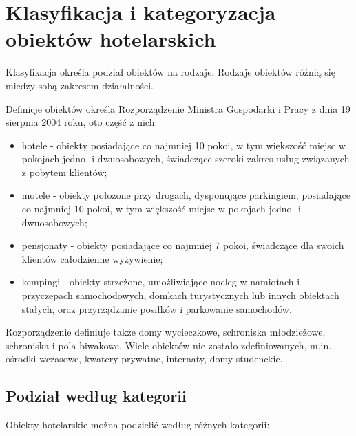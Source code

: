 \documentclass[a4paper,onecolumn,oneside,11pt,wide,floatssmall]{mwrep}
\theoremstyle{definition}
\theoremstyle{plain}%
\theoremstyle{remark}
\begin{document}
\section{Klasyfikacja i kategoryzacja obiektów hotelarskich}
Klasyfikacja określa podział obiektów na rodzaje. Rodzaje obiektów różnią 
się miedzy sobą zakresem działalności.

Definicje obiektów określa Rozporządzenie Ministra Gospodarki i Pracy z dnia 
19 sierpnia 2004 roku, oto część z nich:

\begin{itemize}
  \item hotele - obiekty posiadające co najmniej 10 pokoi, w tym większość 
  miejsc w pokojach jedno- i dwuosobowych, świadczące szeroki zakres usług 
  związanych z pobytem klientów;
  \item motele - obiekty położone przy drogach, dysponujące parkingiem, 
  posiadające co najmniej 10 pokoi, w tym większość miejsc w pokojach jedno- 
  i dwuosobowych;
  \item pensjonaty - obiekty posiadające co najmniej 7 pokoi, świadczące dla 
  swoich klientów całodzienne wyżywienie;
  \item kempingi - obiekty strzeżone, umożliwiające nocleg w namiotach i 
  przyczepach samochodowych, domkach turystycznych lub innych obiektach 
  stałych, oraz przyrządzanie posiłków i parkowanie samochodów.
\end{itemize}

Rozporządzenie definiuje także domy wycieczkowe, schroniska młodzieżowe, 
schroniska i pola biwakowe. Wiele obiektów nie zostało zdefiniowanych, m.in. 
ośrodki wczasowe, kwatery prywatne, internaty, domy studenckie.


\subsection{Podział według kategorii} 
Obiekty hotelarskie można podzielić według różnych kategorii\cite[15-16]{
KlasKatZakHot}:
\end{document}
